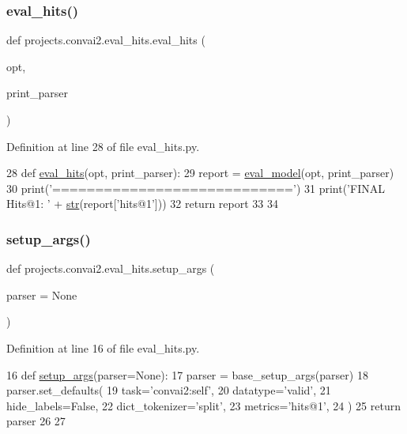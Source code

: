 \subsubsection{\texorpdfstring{eval\+\_\+hits()}{eval\_hits()}}
{\footnotesize\ttfamily def projects.\+convai2.\+eval\+\_\+hits.\+eval\+\_\+hits (\begin{DoxyParamCaption}\item[{}]{opt,  }\item[{}]{print\+\_\+parser }\end{DoxyParamCaption})}



Definition at line 28 of file eval\+\_\+hits.\+py.


\begin{DoxyCode}
28 \textcolor{keyword}{def }\hyperlink{namespaceprojects_1_1convai2_1_1eval__hits_a400fd6a2e183f2cf1da6ebeff169fe70}{eval\_hits}(opt, print\_parser):
29     report = \hyperlink{namespaceeval__model}{eval\_model}(opt, print\_parser)
30     print(\textcolor{stringliteral}{'============================'})
31     print(\textcolor{stringliteral}{'FINAL Hits@1: '} + \hyperlink{namespacegenerate__task__READMEs_a5b88452ffb87b78c8c85ececebafc09f}{str}(report[\textcolor{stringliteral}{'hits@1'}]))
32     \textcolor{keywordflow}{return} report
33 
34 
\end{DoxyCode}
\mbox{\label{namespaceprojects_1_1convai2_1_1eval__hits_a276af35abce11628a8e697b370218cf4}} 
\subsubsection{\texorpdfstring{setup\+\_\+args()}{setup\_args()}}
{\footnotesize\ttfamily def projects.\+convai2.\+eval\+\_\+hits.\+setup\+\_\+args (\begin{DoxyParamCaption}\item[{}]{parser = {\ttfamily None} }\end{DoxyParamCaption})}



Definition at line 16 of file eval\+\_\+hits.\+py.


\begin{DoxyCode}
16 \textcolor{keyword}{def }\hyperlink{namespaceprojects_1_1convai2_1_1eval__hits_a276af35abce11628a8e697b370218cf4}{setup\_args}(parser=None):
17     parser = base\_setup\_args(parser)
18     parser.set\_defaults(
19         task=\textcolor{stringliteral}{'convai2:self'},
20         datatype=\textcolor{stringliteral}{'valid'},
21         hide\_labels=\textcolor{keyword}{False},
22         dict\_tokenizer=\textcolor{stringliteral}{'split'},
23         metrics=\textcolor{stringliteral}{'hits@1'},
24     )
25     \textcolor{keywordflow}{return} parser
26 
27 
\end{DoxyCode}


